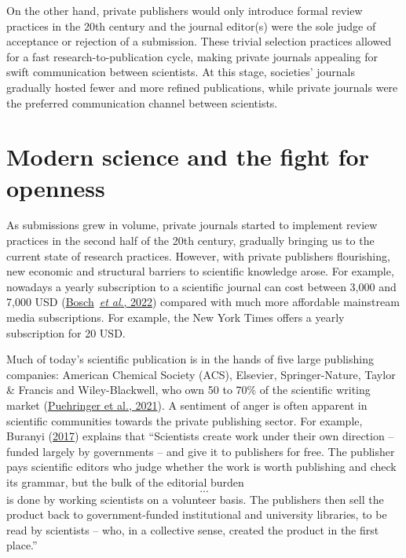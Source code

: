 \documentclass[
]{book}
\begin{document}
On the other hand, private publishers would only introduce formal review practices in the 20th century and the journal editor(s) were the sole judge of acceptance or rejection of a submission. These trivial selection practices allowed for a fast research-to-publication cycle, making private journals appealing for swift communication between scientists. At this stage, societies' journals gradually hosted fewer and more refined publications, while private journals were the preferred communication channel between scientists.

\hypertarget{modern-science-and-the-fight-for-openness}{%
\section{Modern science and the fight for openness}\label{modern-science-and-the-fight-for-openness}}

As submissions grew in volume, private journals started to implement review practices in the second half of the 20th century, gradually bringing us to the current state of research practices. However, with private publishers flourishing, new economic and structural barriers to scientific knowledge arose. For example, nowadays a yearly subscription to a scientific journal can cost between 3,000 and 7,000 USD (\href{https://www.libraryjournal.com/story/Are-We-There-Yet-Periodicals-Price-Survey-2022}{Bosch}~\href{https://www.libraryjournal.com/story/Are-We-There-Yet-Periodicals-Price-Survey-2022}{\emph{et al}}\href{https://www.libraryjournal.com/story/Are-We-There-Yet-Periodicals-Price-Survey-2022}{., 2022}) compared with much more affordable mainstream media subscriptions. For example, the New York Times offers a yearly subscription for 20 USD.

Much of today's scientific publication is in the hands of five large publishing companies: American Chemical Society (ACS), Elsevier, Springer-Nature, Taylor \& Francis and Wiley-Blackwell, who own 50 to 70\% of the scientific writing market (\href{https://journals.plos.org/plosone/article?id=10.1371/journal.pone.0253226}{Puehringer et al., 2021}). A sentiment of anger is often apparent in scientific communities towards the private publishing sector. For example, Buranyi (\href{https://www.theguardian.com/science/2017/jun/27/profitable-business-scientific-publishing-bad-for-science}{2017}) explains that ``Scientists create work under their own direction -- funded largely by governments -- and give it to publishers for free. The publisher pays scientific editors who judge whether the work is worth publishing and check its grammar, but the bulk of the editorial burden \[...\] is done by working scientists on a volunteer basis. The publishers then sell the product back to government-funded institutional and university libraries, to be read by scientists -- who, in a collective sense, created the product in the first place.''
\end{document}
